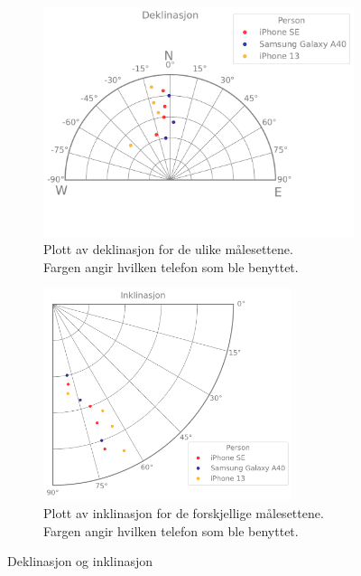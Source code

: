 \begin{figure}[h!]
    \centering
\begin{subfigure}{.45\textwidth}
    \includegraphics[width=1.2\textwidth, scale=1.5]{Plots/declination.pdf}
    \caption{Plott av deklinasjon for de ulike målesettene. \\
    Fargen angir hvilken telefon som ble benyttet.}
    \label{fig:plot_declination}
\end{subfigure}\hfill\begin{subfigure}{.45\textwidth}
    \includegraphics[width=0.8\textwidth, scale=0.5]{Plots/inclination.pdf}
    \caption{Plott av inklinasjon for de forskjellige målesettene. \\
    Fargen angir hvilken telefon som ble benyttet.}
    \label{fig:plot_inklination}
\end{subfigure}
    \caption{Deklinasjon og inklinasjon}
    \label{Ink_og_dek}
\end{figure}


